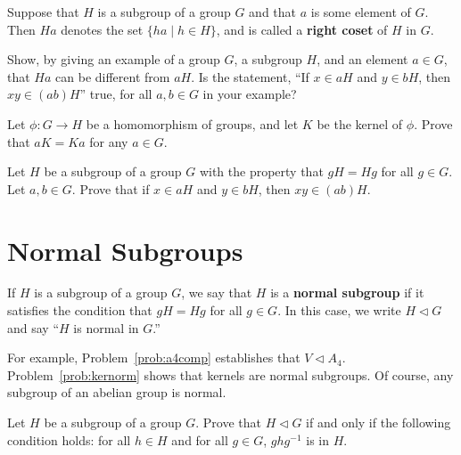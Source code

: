 \begin{definition}
Suppose that \(H\) is a subgroup of a group \(G\) and that \(a\) is some element of \(G\). Then \(Ha\) denotes the set \(\{ha \mid h \in H\}\), and is called a \textbf{right coset} of \(H\) in \(G\).
\end{definition}

\begin{problem}
Show, by giving an example of a group \(G\), a subgroup \(H\), and an element \(a\in G\), that \(Ha\) can be different from \(aH\). Is the statement, ``If \(x\in aH\) and \(y\in bH\), then \(xy \in (ab)H\)'' true, for all \(a,b\in G\) in your example?
\end{problem}

\begin{problem}\label{prob:kernorm}
Let \(\phi:G\longrightarrow H\) be a homomorphism of groups, and let \(K\) be the kernel of \(\phi\). Prove that \(aK = Ka \) for any \(a\in G\).
\end{problem}

\begin{problem}
Let \(H\) be a subgroup of a group \(G\) with the property that \(gH=Hg\) for all \(g\in G\). Let \(a,b\in G\). Prove that if \(x\in aH\) and \(y\in bH\), then \(xy \in (ab)H\).
\end{problem}

\section{Normal Subgroups}

\begin{definition}
If \(H\) is a subgroup of a group \(G\), we say that \(H\) is a \textbf{normal subgroup} if it satisfies the condition that \(gH = Hg\) for all \(g \in G\). In this case, we write \(H \lhd G\) and say ``\(H\)  is normal in \(G\).''
\end{definition}

For example, Problem~\ref{prob:a4comp} establishes that \(V \lhd A_4\). Problem~\ref{prob:kernorm} shows that kernels are normal subgroups. Of course, any subgroup of an abelian group is normal.

\begin{problem}\label{prob:normtest}
Let \(H\) be a subgroup of a group \(G\). Prove that \(H \lhd G\) if and only if the following condition holds: for all \(h\in H\) and for all \(g\in G\), \(ghg^{-1}\) is in \(H\).
\begin{annotation}
\end{annotation}
\end{problem}

